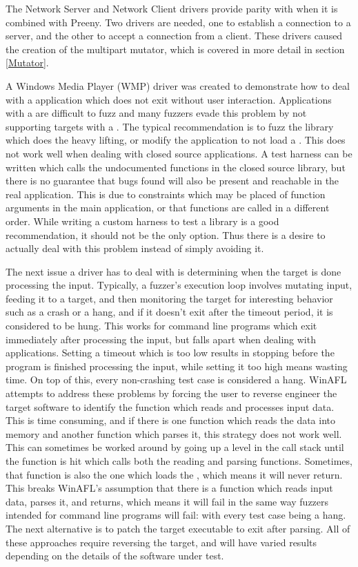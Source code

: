 The Network Server and Network Client drivers provide parity with \AFL{} when it
is combined with Preeny.  Two drivers are needed, one to establish
a connection to a server, and the other to accept a connection from a
client. These drivers caused the creation of the multipart mutator,
which is covered in more detail in section \ref{Mutator}.

A Windows Media Player (WMP) driver was created to demonstrate how to deal with
a \GUI{} application which does not exit without user interaction. Applications
with a \GUI{} are difficult to fuzz and many fuzzers evade this problem by not
supporting targets with a \GUI{}.  The typical recommendation is to fuzz the library
which does the heavy lifting, or modify the application to not load a \GUI{}.
This does not work well when dealing with closed source applications. A test
harness can be written which calls the undocumented functions in the closed
source library, but there is no guarantee that bugs found will also be present
and reachable in the real application.  This is due to constraints which may
be placed of function arguments in the main application, or that functions are
called in a different order.  While writing a custom harness to test a library
is a good recommendation, it should not be the only option. Thus there is a
desire to actually deal with this problem instead of simply avoiding it.

The next issue a driver has to deal with is determining when the target is done
processing the input.
Typically, a fuzzer's execution loop involves mutating input, feeding it to a
target, and then monitoring the target for interesting behavior such as a crash
or a hang, and if it doesn't exit after the timeout period, it is considered to
be hung.  This works for command line programs which exit immediately after processing
the input, but falls apart when dealing with \GUI{} applications.
Setting a timeout which is too low results in stopping before the
program is finished processing the input, while setting it too high means
wasting time. On top of this, every non-crashing test case is considered
a hang. WinAFL attempts to address these problems by forcing the user to
reverse engineer the target software to identify the function which reads and
processes input data.  This is time consuming, and if there is one function
which reads the data into memory and another function which parses it, this
strategy does not work well. This can sometimes be worked around by going up
a level in the call stack until the function is hit which calls both the reading and parsing functions.
Sometimes, that function is also the one which loads the \GUI{}, which means
it will never return. This breaks WinAFL's assumption that there is a function
which reads input data, parses it, and returns, which means it will fail in the
same way fuzzers intended for command line programs will fail: with every test
case being a hang.  The next alternative is to patch the target executable
to exit after parsing. All of these approaches require reversing the target,
and will have varied results depending on the details of the software under test.

